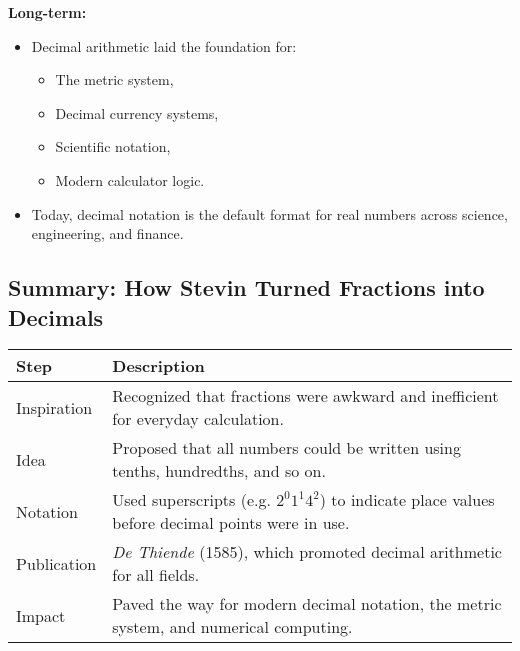\textbf{Long-term:}
\begin{itemize}
    \item Decimal arithmetic laid the foundation for:
    \begin{itemize}
        \item The metric system,
        \item Decimal currency systems,
        \item Scientific notation,
        \item Modern calculator logic.
    \end{itemize}
    \item Today, decimal notation is the default format for real numbers across science, engineering, and finance.
\end{itemize}

\subsection{Summary: How Stevin Turned Fractions into Decimals}

\begin{center}
\renewcommand{\arraystretch}{1.4}
\begin{tabular}{|l|p{10cm}|}
\hline
\textbf{Step} & \textbf{Description} \\
\hline
Inspiration & Recognized that fractions were awkward and inefficient for everyday calculation. \\
\hline
Idea & Proposed that all numbers could be written using tenths, hundredths, and so on. \\
\hline
Notation & Used superscripts (e.g. \( 2^{0}1^{1}4^{2} \)) to indicate place values before decimal points were in use. \\
\hline
Publication & \textit{De Thiende} (1585), which promoted decimal arithmetic for all fields. \\
\hline
Impact & Paved the way for modern decimal notation, the metric system, and numerical computing. \\
\hline
\end{tabular}
\end{center}


